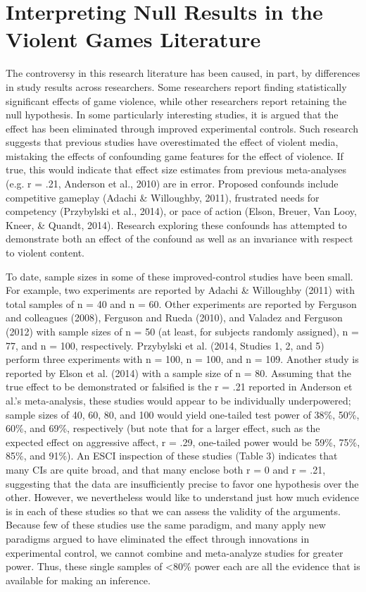 \documentclass{article}
\begin{document}
\section{Interpreting Null Results in the Violent Games Literature}
The controversy in this research literature has been caused, in part, by differences in study results across researchers. Some researchers report finding statistically significant effects of game violence, while other researchers report retaining the null hypothesis. In some particularly interesting studies, it is argued that the effect has been eliminated through improved experimental controls. Such research suggests that previous studies have overestimated the effect of violent media, mistaking the effects of confounding game features for the effect of violence. If true, this would indicate that effect size estimates from previous meta-analyses (e.g. r = .21, Anderson et al., 2010) are in error. Proposed confounds include competitive gameplay (Adachi \& Willoughby, 2011), frustrated needs for competency (Przybylski et al., 2014), or pace of action (Elson, Breuer, Van Looy, Kneer, \& Quandt, 2014). Research exploring these confounds has attempted to demonstrate both an effect of the confound as well as an invariance with respect to violent content. 

To date, sample sizes in some of these improved-control studies have been small. For example, two experiments are reported by Adachi \& Willoughby (2011) with total samples of n = 40 and n = 60. Other experiments are reported by Ferguson and colleagues (2008), Ferguson and Rueda (2010), and Valadez and Ferguson (2012) with sample sizes of n = 50 (at least, for subjects randomly assigned), n = 77, and n = 100, respectively. Przybylski et al. (2014, Studies 1, 2, and 5) perform three experiments with n = 100, n = 100, and n = 109. Another study is reported by Elson et al. (2014) with a sample size of n = 80. Assuming that the true effect to be demonstrated or falsified is the r = .21 reported in Anderson et al.’s meta-analysis, these studies would appear to be individually underpowered; sample sizes of 40, 60, 80, and 100 would yield one-tailed test power of 38\%, 50\%, 60\%, and 69\%, respectively (but note that for a larger effect, such as the expected effect on aggressive affect, r = .29, one-tailed power would be 59\%, 75\%, 85\%, and 91\%). An ESCI inspection of these studies (Table 3) indicates that many CIs are quite broad, and that many enclose both r = 0 and r = .21, suggesting that the data are insufficiently precise to favor one hypothesis over the other. However, we nevertheless would like to understand just how much evidence is in each of these studies so that we can assess the validity of the arguments. Because few of these studies use the same paradigm, and many apply new paradigms argued to have eliminated the effect through innovations in experimental control, we cannot combine and meta-analyze studies for greater power. Thus, these single samples of <80\% power each are all the evidence that is available for making an inference.
\end{document}
